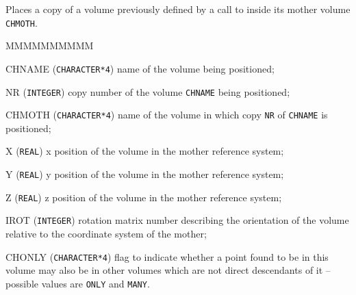               


Places a copy of a volume previously defined by a call to  
inside its mother volume {\tt CHMOTH}.

\begin{DLtt}{MMMMMMMMMM}
\item[CHNAME] ({\tt CHARACTER*4}) name of the volume being positioned;
\item[NR] ({\tt INTEGER}) copy number of the volume {\tt CHNAME} being 
positioned;
\item[CHMOTH]({\tt CHARACTER*4}) name of the volume in which copy
{\tt NR} of {\tt CHNAME} is positioned;
\item[X] ({\tt REAL}) x position of the volume in the mother reference system;
\item[Y] ({\tt REAL}) y position of the volume in the mother reference system;
\item[Z] ({\tt REAL}) z position of the volume in the mother reference system;
\item[IROT] ({\tt INTEGER}) rotation matrix number
describing the orientation of the volume relative to
the coordinate system of the mother;
\item[CHONLY] ({\tt CHARACTER*4}) flag to indicate whether
a point found to be in this volume may also be in other volumes which
are not direct descendants of it -- possible values are {\tt ONLY} and
{\tt MANY}.
\end{DLtt}

